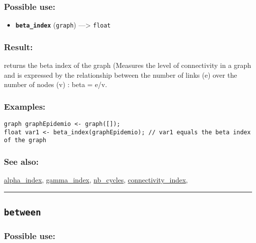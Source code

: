 \documentclass[]{book}
\providecommand{\tightlist}{%
  \setlength{\itemsep}{0pt}\setlength{\parskip}{0pt}}
\theoremstyle{definition}
\theoremstyle{definition}
\theoremstyle{definition}
\theoremstyle{remark}
\begin{document}
\subsubsection{Possible use:}\label{possible-use-66}

\begin{itemize}
\tightlist
\item
  \textbf{\texttt{beta\_index}} (\texttt{graph}) ---\textgreater{}
  \texttt{float}
\end{itemize}

\subsubsection{Result:}\label{result-65}

returns the beta index of the graph (Measures the level of connectivity
in a graph and is expressed by the relationship between the number of
links (e) over the number of nodes (v) : beta = e/v.

\subsubsection{Examples:}\label{examples-52}

\begin{verbatim}
graph graphEpidemio <- graph([]);  
float var1 <- beta_index(graphEpidemio); // var1 equals the beta index of the graph
\end{verbatim}

\subsubsection{See also:}\label{see-also-43}

\href{OperatorsAA\#alpha_index}{alpha\_index},
\href{OperatorsDH\#gamma_index}{gamma\_index},
\href{OperatorsNR\#nb_cycles}{nb\_cycles},
\href{OperatorsBC\#connectivity_index}{connectivity\_index},

\begin{center}\rule{0.5\linewidth}{\linethickness}\end{center}

\subsection{\texorpdfstring{\texttt{between}}{between}}\label{between}

\subsubsection{Possible use:}\label{possible-use-67}
\end{document}
